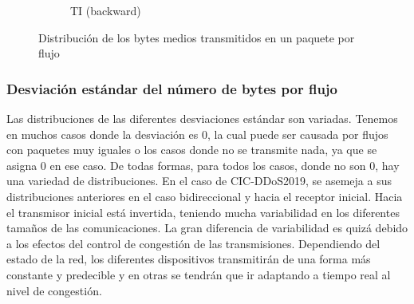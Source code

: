 \begin{figure}[H]
\begin{subfigure}[b]{0.26\textwidth}
        \caption{TI (backward)}
    \end{subfigure}
    \hfill
       \caption{Distribución de los bytes medios transmitidos en un paquete por flujo}
       \label{fig:packet_pincer_packet_bytes_mean}
\end{figure}

\subsubsection{Desviación estándar del número de bytes por flujo}

Las distribuciones de las diferentes desviaciones estándar son variadas. Tenemos en muchos casos donde la desviación es 0, la cual puede ser causada por flujos con paquetes muy iguales o los casos donde no se transmite nada, ya que se asigna 0 en ese caso. De todas formas, para todos los casos, donde no son 0, hay una variedad de distribuciones. En el caso de CIC-DDoS2019, se asemeja a sus distribuciones anteriores en el caso bidireccional y hacia el receptor inicial. Hacia el transmisor inicial está invertida, teniendo mucha variabilidad en los diferentes tamaños de las comunicaciones. La gran diferencia de variabilidad es quizá debido a los efectos del control de congestión de las transmisiones. Dependiendo del estado de la red, los diferentes dispositivos transmitirán de una forma más constante y predecible y en otras se tendrán que ir adaptando a tiempo real al nivel de congestión.

